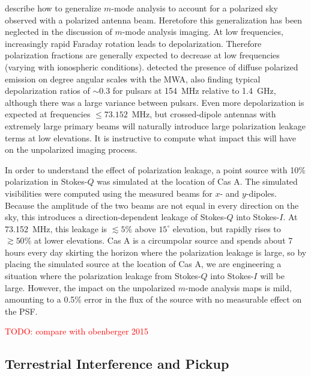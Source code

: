 \documentclass[twocolumn]{aastex61}
\newcommand{\todo}[1]{\textcolor{red}{TODO: #1}\PackageWarning{TODO:}{#1!}}
\begin{document}
\citet{2015PhRvD..91h3514S} describe how to generalize $m$-mode analysis to account for a polarized
sky observed with a polarized antenna beam. Heretofore this generalization has been neglected in the
discussion of $m$-mode analysis imaging.  At low frequencies, increasingly rapid Faraday rotation
leads to depolarization. Therefore polarization fractions are generally expected to decrease at low
frequencies (varying with ionospheric conditions). \citet{2016ApJ...830...38L} detected the presence
of diffuse polarized emission on degree angular scales with the MWA, also finding typical
depolarization ratios of $\sim0.3$ for pulsars at 154~MHz relative to 1.4~GHz, although there was a
large variance between pulsars. Even more depolarization is expected at frequencies $\le
73.152$~MHz, but crossed-dipole antennas with extremely large primary beams will naturally introduce
large polarization leakage terms at low elevations.  It is instructive to compute what impact this
will have on the unpolarized imaging process.

In order to understand the effect of polarization leakage, a point source with 10\% polarization in
Stokes-$Q$ was simulated at the location of Cas A.  The simulated visibilities were computed using
the measured beams for $x$- and $y$-dipoles. Because the amplitude of the two beams are not equal in
every direction on the sky, this introduces a direction-dependent leakage of Stokes-$Q$ into
Stokes-$I$. At 73.152~MHz, this leakage is $\lesssim5\%$ above $15^\circ$ elevation, but rapidly
rises to $\gtrsim50\%$ at lower elevations. Cas A is a circumpolar source and spends about 7 hours
every day skirting the horizon where the polarization leakage is large, so by placing the simulated
source at the location of Cas A, we are engineering a situation where the polarization leakage from
Stokes-$Q$ into Stokes-$I$ will be large. However, the impact on the unpolarized $m$-mode analysis
maps is mild, amounting to a 0.5\% error in the flux of the source with no measurable effect on the
PSF.

\todo{compare with obenberger 2015}

\subsection{Terrestrial Interference and Pickup}\label{sec:rfi}
\end{document}
